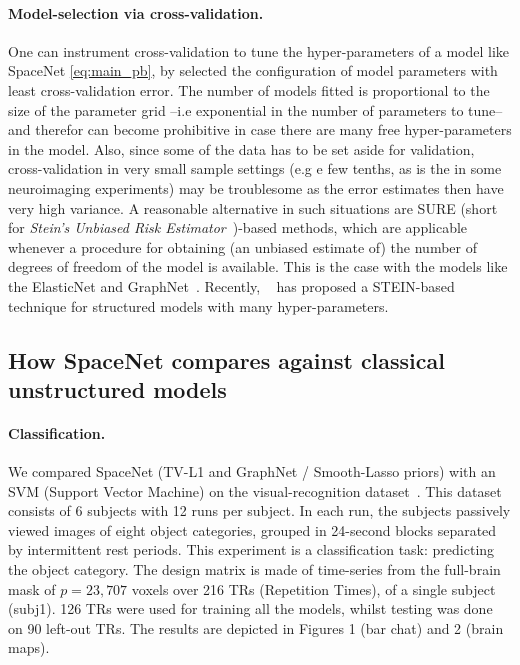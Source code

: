 \paragraph{Model-selection via cross-validation.}
One can instrument cross-validation to tune the hyper-parameters of a model like SpaceNet \eqref{eq:main_pb}, by selected the configuration of model parameters with least cross-validation error. The number of models fitted is proportional to the size of the parameter grid --i.e exponential in the number of parameters to tune-- and therefor can become prohibitive in case there are many free hyper-parameters in the model. Also, since some of the data has to be set aside for validation, cross-validation in very small sample settings (e.g e few tenths, as is the in some neuroimaging experiments) may be troublesome as the error estimates then have very high variance. A reasonable alternative in such situations are SURE (short for \textit{Stein's Unbiased Risk Estimator}~\citep{stein1981})-based methods,
which are applicable whenever a procedure for obtaining (an unbiased estimate of) the number of degrees of freedom of the model is available. This is the case with the models like the ElasticNet and
GraphNet~\citep{hebiri2011}. Recently, ~\citep{sugar} has proposed a STEIN-based technique for structured models with many hyper-parameters.


\subsection{How SpaceNet compares against classical unstructured models}
\paragraph{Classification.}
We compared SpaceNet (TV-L1 and GraphNet / Smooth-Lasso priors) with an SVM (Support Vector Machine) on the visual-recognition dataset~\citep{haxby2001}. This dataset consists of 6 subjects with 12 runs per subject. In each run, the subjects passively viewed images of eight object categories, grouped in 24-second blocks separated by intermittent rest periods. This experiment is a classification task: predicting the object category. The design matrix is made of time-series from the full-brain mask of $p=23,707$ voxels over 216 TRs (Repetition Times), of a single subject (subj1). 126 TRs were used for training all the models, whilst testing was done on 90 left-out TRs. The results are depicted in Figures 1 (bar chat) and 2 (brain maps).

